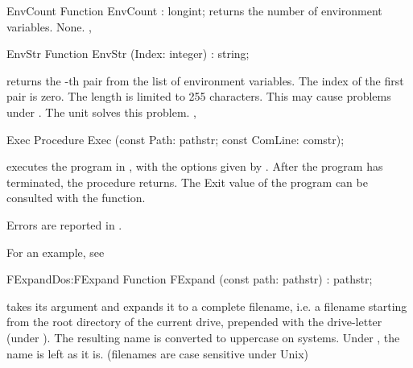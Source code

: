 \latex{}
\html{}

\begin{function}{EnvCount}
\Declaration
Function EnvCount  : longint;
\Description
{} returns the number of environment variables.
\Errors
None.
\SeeAlso
{}, 
\end{function}

\begin{function}{EnvStr}
\Declaration
Function EnvStr (Index: integer) : string;
\Description

 returns the -th  pair from the list
of environment variables. 
The index of the first pair is zero.
\Errors
The length is limited to 255 characters. This may cause problems under
\linux. The \linux unit solves this problem.
\SeeAlso
{}, 
\end{function}
\latex{}
\html{}
\begin{procedure}{Exec}
\Declaration
Procedure Exec (const Path: pathstr; const ComLine: comstr);

\Description

 executes the program in , with the options given by
.
After the program has terminated, the procedure returns. The Exit value of
the program can be consulted with the  function.

\Errors
Errors are reported in .
\SeeAlso
{}
\end{procedure}
For an example, see 
\begin{functionl}{FExpand}{Dos:FExpand}
\Declaration
Function FExpand (const path: pathstr) : pathstr;

\Description

 takes its argument and expands it to a complete filename, i.e.
a filename starting from the root directory of the current drive, prepended
with the drive-letter (under \dos).
The resulting name is converted to uppercase on \dos systems. Under \linux,
the name is left as it is. (filenames are case sensitive under Unix)

\Errors
{}
\SeeAlso

\end{functionl}
\html{}
